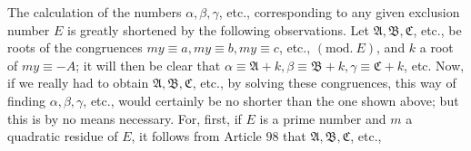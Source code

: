The calculation of the numbers \(\alpha,\allowbreak \beta,\allowbreak \gamma\), etc., corresponding to any given exclusion number \(E\) is greatly shortened by the following observations. Let \(\mathfrak A,\allowbreak \mathfrak B,\allowbreak \mathfrak C\), etc., be roots of the congruences \(my\equiv a,\allowbreak my\equiv b,\allowbreak my\equiv c\), etc., \((\mathrm{mod.}\ E)\), and \(k\) a root of \(my\equiv-A\); it will then be clear that \(\alpha\equiv\mathfrak A+k,\allowbreak \beta\equiv\mathfrak B+k,\allowbreak \gamma\equiv\mathfrak C+k\), etc. Now, if we really had to obtain \(\mathfrak A,\allowbreak \mathfrak B,\allowbreak \mathfrak C\), etc., by solving these congruences, this way of finding \(\alpha,\allowbreak \beta,\allowbreak \gamma\), etc., would certainly be no shorter than the one shown above; but this is by no means necessary. For, first, if \(E\) is a prime number and \(m\) a quadratic residue of \(E\), it follows from Article \(98\) that \(\mathfrak A,\allowbreak \mathfrak B,\allowbreak \mathfrak C\), etc.,

